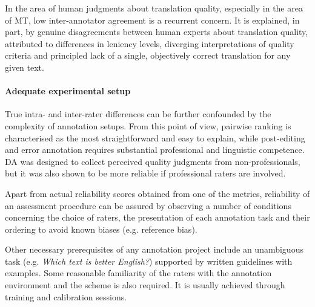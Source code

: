 
In the area of human judgments about translation quality, especially in the area of MT, low inter-annotator agreement is a recurrent concern. It is explained, in part, by genuine disagreements between human experts about translation  quality, attributed to differences in leniency levels, diverging interpretations of quality criteria and principled lack of a single, objectively correct translation for any given text. 

\paragraph{Adequate experimental setup} 
True intra- and inter-rater differences can be further confounded by the complexity of annotation setups. From this point of view, pairwise ranking is characterised as the most straightforward and easy to explain, while post-editing and error annotation requires substantial professional and linguistic competence. \gls{DA} was designed to collect perceived quality judgments from non-professionals, but it was also shown to be more reliable if professional raters are involved. 

Apart from actual reliability scores obtained from one of the metrics, reliability of an assessment procedure can be assured by observing a number of conditions concerning the choice of raters, the presentation of each annotation task and their ordering to avoid known biases (e.g. reference bias).

Other necessary prerequisites of any annotation project include an unambiguous task (e.g. \emph{Which text is better English?}) supported by written guidelines with examples. Some reasonable familiarity of the raters with the annotation environment and the scheme is also required. It is usually achieved through training and calibration sessions. 

